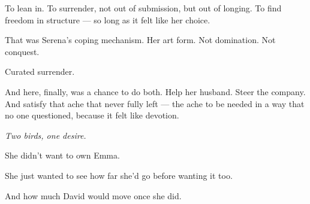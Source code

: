 To lean in.
To surrender, not out of submission, but out of longing.
To find freedom in structure — so long as it felt like her choice.

That was Serena’s coping mechanism. Her art form.
Not domination. Not conquest.

Curated surrender.

\medskip

And here, finally, was a chance to do both.
Help her husband. Steer the company.
And satisfy that ache that never fully left — the ache to be needed in a way that no one questioned,
because it felt like devotion.

\textit{Two birds, one desire.}

She didn’t want to own Emma.

She just wanted to see how far she’d go before wanting it too.

And how much David would move once she did.

\medskip

